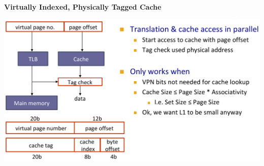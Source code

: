 \textbf{Virtually Indexed, Physically Tagged Cache}

\includegraphics[width=\linewidth]{png/tlblook.png}
